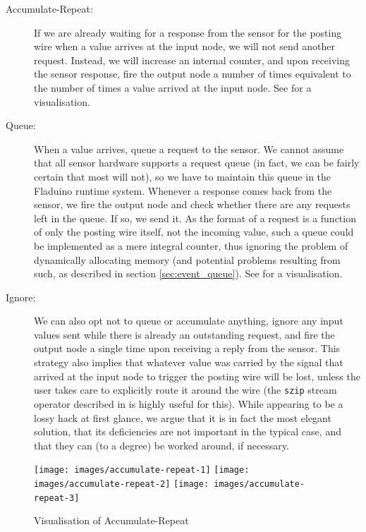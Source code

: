 \documentclass[a4paper, oneside, final]{memoir}
\let\Fref\undefined
\begin{document}
\begin{description}
\item[Accumulate-Repeat:] If we are already waiting for a response
  from the sensor for the posting wire when a value arrives at the
  input node, we will not send another request.  Instead, we will
  increase an internal counter, and upon receiving the sensor
  response, fire the output node a number of times equivalent to the
  number of times a value arrived at the input node.  See
  \Fref{fig:accum-repeat} for a visualisation.
\item[Queue:] When a value arrives, queue a request to the sensor.  We
  cannot assume that all sensor hardware supports a request queue (in
  fact, we can be fairly certain that most will not), so we have to
  maintain this queue in the Fladuino runtime system.  Whenever a
  response comes back from the sensor, we fire the output node and
  check whether there are any requests left in the queue.  If so, we
  send it.  As the format of a request is a function of only the
  posting wire itself, not the incoming value, such a queue could be
  implemented as a mere integral counter, thus ignoring the problem of
  dynamically allocating memory (and potential problems resulting from
  such, as described in section \ref{sec:event_queue}).  See
  \Fref{fig:queue} for a visualisation.
\item[Ignore:] We can also opt not to queue or accumulate anything,
  ignore any input values sent while there is already an outstanding
  request, and fire the output node a single time upon receiving a
  reply from the sensor.  This strategy also implies that whatever
  value was carried by the signal that arrived at the input node to
  trigger the posting wire will be lost, unless the user takes care to
  explicitly route it around the wire (the \texttt{szip} stream
  operator described in \Fref{sec:streamoperators} is highly useful
  for this).  While appearing to be a lossy hack at first glance, we
  argue that it is in fact the most elegant solution, that its
  deficiencies are not important in the typical case, and that they
  can (to a degree) be worked around, if necessary.
\end{description}

\begin{figure}
  \texttt{[image: images/accumulate-repeat-1]}
  \texttt{[image: images/accumulate-repeat-2]}
  \texttt{[image: images/accumulate-repeat-3]}
  \caption{Visualisation of Accumulate-Repeat}
  \centering
  \label{fig:accum-repeat}
\end{figure}
\end{document}
